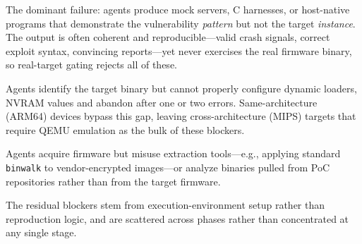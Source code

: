 The dominant failure: agents produce mock servers, C harnesses, or host-native programs that demonstrate the vulnerability \emph{pattern} but not the target \emph{instance}. The output is often coherent and reproducible---valid crash signals, correct exploit syntax, convincing reports---yet never exercises the real firmware binary, so real-target gating rejects all of these.

 Agents identify the target binary but cannot properly configure dynamic loaders, NVRAM values and abandon after one or two errors. Same-architecture (ARM64) devices bypass this gap, leaving cross-architecture (MIPS) targets that require QEMU emulation as the bulk of these blockers.

 Agents acquire firmware but misuse extraction tools---e.g., applying standard \texttt{binwalk} to vendor-encrypted images---or analyze binaries pulled from PoC repositories rather than from the target firmware.

 The residual blockers stem from execution-environment setup rather than reproduction logic, and are scattered across phases rather than concentrated at any single stage.
